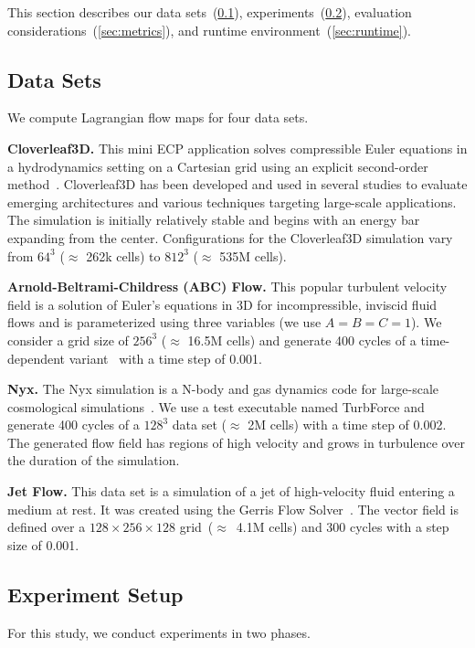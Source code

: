 This section describes our data sets~(\ref{sec:datasets}), experiments~(\ref{sec:experiments}), evaluation considerations~(\ref{sec:metrics}), and runtime environment~(\ref{sec:runtime}).
%
\subsection{Data Sets}
\label{sec:datasets}
We compute Lagrangian flow maps for four data sets.

\textbf{Cloverleaf3D.} This mini ECP application solves compressible Euler equations in a hydrodynamics setting on a Cartesian grid using an explicit second-order method~\cite{mallinson2013cloverleaf}.
%
Cloverleaf3D has been developed and used in several studies to evaluate emerging architectures and various techniques targeting large-scale applications.
%
The simulation is initially relatively stable and begins with an energy bar expanding from the center.
%
Configurations for the Cloverleaf3D simulation vary from $64^{3}$ ($\approx$ 262k cells) to $812^{3}$ ($\approx$ 535M cells).

\textbf{Arnold-Beltrami-Childress (ABC) Flow.} This popular turbulent velocity field is a solution of Euler's equations in 3D for incompressible, inviscid fluid flows and is parameterized using three variables (we use $A=B=C=1$). 
%
%
We consider a grid size of $256^{3}$ ($\approx$ 16.5M cells) and generate 400 cycles of a time-dependent variant~\cite{brummell2001linear} with a time step of 0.001.

\textbf{Nyx.} The Nyx simulation is a N-body and gas dynamics code for large-scale cosmological simulations~\cite{almgren2013nyx}. 
%
We use a test executable named TurbForce and generate 400 cycles of a $128^3$ data set ($\approx$ 2M cells) with a time step of 0.002.
%
The generated flow field has regions of high velocity and grows in turbulence over the duration of the simulation. 

\textbf{Jet Flow.} This data set is a simulation of a jet of high-velocity fluid entering a medium at rest. 
%
It was created using the Gerris Flow Solver~\cite{popinet2003gerris}.
%
The vector field is defined over a $128\times256\times128$ grid~($\approx$~4.1M cells) and 300 cycles with a step size of 0.001.
%
\subsection{Experiment Setup}
\label{sec:experiments}
For this study, we conduct experiments in two phases. 

